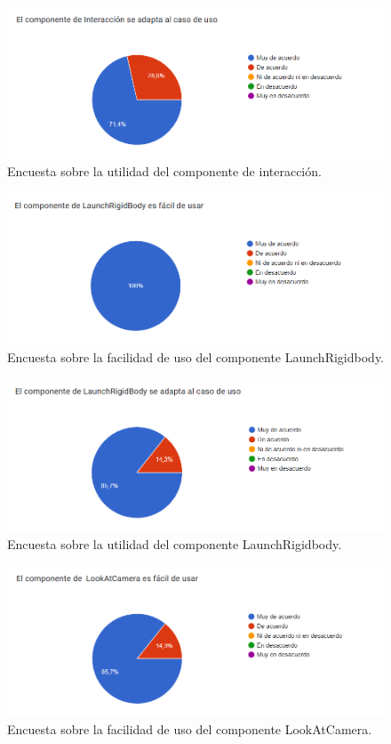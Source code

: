 \begin{figure}[H]
  \centering
  \includegraphics[width=450px,clip=true]{CUESTIONARIO_21.png}
  \caption{Encuesta sobre la utilidad del componente de interacción.}
  \label{fig:CUESTIONARIO_21}
\end{figure}
\raggedbottom

\begin{figure}[H]
  \centering
  \includegraphics[width=450px,clip=true]{CUESTIONARIO_22.png}
  \caption{Encuesta sobre la facilidad de uso del componente LaunchRigidbody.}
  \label{fig:CUESTIONARIO_22}
\end{figure}
\raggedbottom

\begin{figure}[H]
  \centering
  \includegraphics[width=450px,clip=true]{CUESTIONARIO_23.png}
  \caption{Encuesta sobre la utilidad del componente LaunchRigidbody.}
  \label{fig:CUESTIONARIO_23}
\end{figure}
\raggedbottom

\begin{figure}[H]
  \centering
  \includegraphics[width=450px,clip=true]{CUESTIONARIO_24.png}
  \caption{Encuesta sobre la facilidad de uso del componente LookAtCamera.}
  \label{fig:CUESTIONARIO_24}
\end{figure}
\raggedbottom

